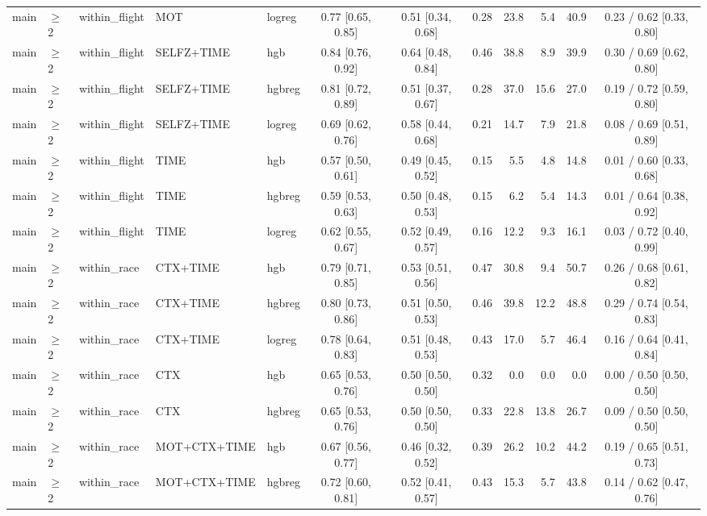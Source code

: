 \begin{longtable}{@{}lllllcccrrrc@{}}
main & $\geq$2 & within\_flight & MOT & logreg & 0.77 [0.65, 0.85] & 0.51 [0.34, 0.68] & 0.28 & 23.8 & 5.4 & 40.9 & 0.23 / 0.62 [0.33, 0.80] \\
main & $\geq$2 & within\_flight & SELFZ+TIME & hgb & 0.84 [0.76, 0.92] & 0.64 [0.48, 0.84] & 0.46 & 38.8 & 8.9 & 39.9 & 0.30 / 0.69 [0.62, 0.80] \\
main & $\geq$2 & within\_flight & SELFZ+TIME & hgbreg & 0.81 [0.72, 0.89] & 0.51 [0.37, 0.67] & 0.28 & 37.0 & 15.6 & 27.0 & 0.19 / 0.72 [0.59, 0.80] \\
main & $\geq$2 & within\_flight & SELFZ+TIME & logreg & 0.69 [0.62, 0.76] & 0.58 [0.44, 0.68] & 0.21 & 14.7 & 7.9 & 21.8 & 0.08 / 0.69 [0.51, 0.89] \\
main & $\geq$2 & within\_flight & TIME & hgb & 0.57 [0.50, 0.61] & 0.49 [0.45, 0.52] & 0.15 & 5.5 & 4.8 & 14.8 & 0.01 / 0.60 [0.33, 0.68] \\
main & $\geq$2 & within\_flight & TIME & hgbreg & 0.59 [0.53, 0.63] & 0.50 [0.48, 0.53] & 0.15 & 6.2 & 5.4 & 14.3 & 0.01 / 0.64 [0.38, 0.92] \\
main & $\geq$2 & within\_flight & TIME & logreg & 0.62 [0.55, 0.67] & 0.52 [0.49, 0.57] & 0.16 & 12.2 & 9.3 & 16.1 & 0.03 / 0.72 [0.40, 0.99] \\
main & $\geq$2 & within\_race & CTX+TIME & hgb & 0.79 [0.71, 0.85] & 0.53 [0.51, 0.56] & 0.47 & 30.8 & 9.4 & 50.7 & 0.26 / 0.68 [0.61, 0.82] \\
main & $\geq$2 & within\_race & CTX+TIME & hgbreg & 0.80 [0.73, 0.86] & 0.51 [0.50, 0.53] & 0.46 & 39.8 & 12.2 & 48.8 & 0.29 / 0.74 [0.54, 0.83] \\
main & $\geq$2 & within\_race & CTX+TIME & logreg & 0.78 [0.64, 0.83] & 0.51 [0.48, 0.53] & 0.43 & 17.0 & 5.7 & 46.4 & 0.16 / 0.64 [0.41, 0.84] \\
main & $\geq$2 & within\_race & CTX & hgb & 0.65 [0.53, 0.76] & 0.50 [0.50, 0.50] & 0.32 & 0.0 & 0.0 & 0.0 & 0.00 / 0.50 [0.50, 0.50] \\
main & $\geq$2 & within\_race & CTX & hgbreg & 0.65 [0.53, 0.76] & 0.50 [0.50, 0.50] & 0.33 & 22.8 & 13.8 & 26.7 & 0.09 / 0.50 [0.50, 0.50] \\
main & $\geq$2 & within\_race & MOT+CTX+TIME & hgb & 0.67 [0.56, 0.77] & 0.46 [0.32, 0.52] & 0.39 & 26.2 & 10.2 & 44.2 & 0.19 / 0.65 [0.51, 0.73] \\
main & $\geq$2 & within\_race & MOT+CTX+TIME & hgbreg & 0.72 [0.60, 0.81] & 0.52 [0.41, 0.57] & 0.43 & 15.3 & 5.7 & 43.8 & 0.14 / 0.62 [0.47, 0.76] \\

\end{longtable}
